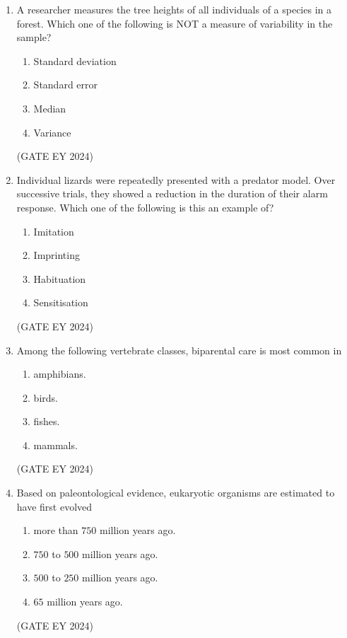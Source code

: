 \documentclass[journal]{IEEEtran}
\begin{document}
\begin{enumerate}
\item A researcher measures the tree heights of all individuals of a species in a forest. Which one of the following is NOT a measure of variability in the sample?
    \begin{multicols}{2}
    \begin{enumerate}
        \item Standard deviation
        \item Standard error
        \item Median
        \item Variance
    \end{enumerate}
    \end{multicols}
\hfill{(GATE EY 2024)}

\item Individual lizards were repeatedly presented with a predator model. Over successive trials, they showed a reduction in the duration of their alarm response. Which one of the following is this an example of?
    \begin{multicols}{2}
    \begin{enumerate}
        \item Imitation
        \item Imprinting
        \item Habituation
        \item Sensitisation
    \end{enumerate}
    \end{multicols}
\hfill{(GATE EY 2024)}

\item Among the following vertebrate classes, biparental care is most common in
    \begin{multicols}{2}
    \begin{enumerate}
        \item amphibians.
        \item birds.
        \item fishes.
        \item mammals.
    \end{enumerate}
    \end{multicols}
\hfill{(GATE EY 2024)}

\item Based on paleontological evidence, eukaryotic organisms are estimated to have first evolved
    \begin{enumerate}
        \item more than $750$ million years ago.
        \item $750$ to $500$ million years ago.
        \item $500$ to $250$ million years ago.
        \item $65$ million years ago.
    \end{enumerate}
\hfill{(GATE EY 2024)}


\end{enumerate}
\end{document}

